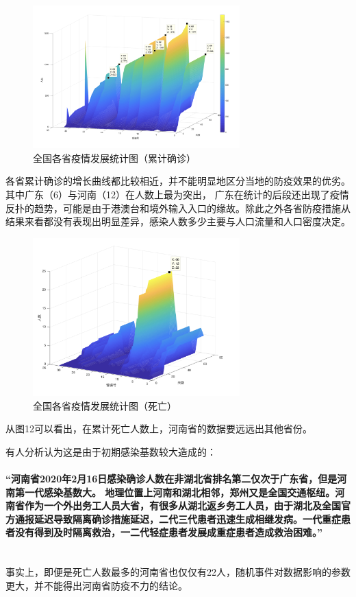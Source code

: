 \documentclass[UTF8]{ctexart}
\begin{document}
\begin{figure}[htbp]
\centering
\includegraphics[width=8cm]{12.png} 
\caption{全国各省疫情发展统计图（累计确诊）}
\end{figure}
\par
各省累计确诊的增长曲线都比较相近，并不能明显地区分当地的防疫效果的优劣。
其中广东（6）与河南（12）在人数上最为突出，
广东在统计的后段还出现了疫情反扑的趋势，可能是由于港澳台和境外输入入口的缘故。除此之外各省防疫措施从结果来看都没有表现出明显差异，感染人数多少主要与人口流量和人口密度决定。

\begin{figure}[htbp][H]
\centering
\includegraphics[width=8cm]{13.png} 
\caption{全国各省疫情发展统计图（死亡）}
\end{figure}
\par
从图12可以看出，在累计死亡人数上，河南省的数据要远远出其他省份。

\par 
有人\cite{bib3}分析认为这是由于初期感染基数较大造成的：
  \paragraph{  “河南省2020年2月16日感染确诊人数在非湖北省排名第二仅次于广东省，但是河南第一代感染基数大。
    地理位置上河南和湖北相邻，郑州又是全国交通枢纽。河南省作为一个外出务工人员大省，有很多从湖北返乡务工人员，由于湖北及全国官方通报延迟导致隔离确诊措施延迟，二代三代患者迅速生成相继发病。一代重症患者没有得到及时隔离救治，一二代轻症患者发展成重症患者造成救治困难。”
    \\\hspace*{\fill}\\
}
\par
事实上，即便是死亡人数最多的河南省也仅仅有22人，随机事件对数据影响的参数更大，并不能得出河南省防疫不力的结论。
\end{document}
